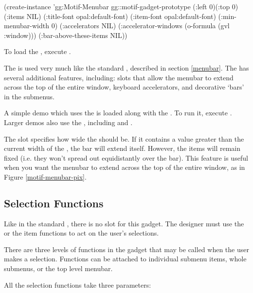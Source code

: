\begin{programexample}
(create-instance 'gg:Motif-Menubar gg::motif-gadget-prototype
  (:left 0)(:top 0)
  (:items NIL)
  (:title-font opal:default-font)
  (:item-font opal:default-font)
  (:min-menubar-width 0)
  (:accelerators NIL)
  (:accelerator-windows (o-formula (gvl :window)))
  (:bar-above-these-items NIL))
\end{programexample}

To load the , execute
.

The  is used very much like the standard ,
described in section \ref{menubar}.
The  has several additional features, including:
slots that allow the menubar to extend across the top of the entire window,
keyboard accelerators, and decorative `bars' in the submenus.

A simple demo which uses the  is loaded along with the
.  To run it, execute .
Larger demos also use the , including  and
.

The  slot specifies how wide the 
should be.  If it contains a value greater than the current
width of the , the bar will extend itself.  However, the
items will remain fixed (i.e. they won't spread out equidistantly over
the bar).  This feature is useful when you want the menubar to extend across
the top of the entire window, as in Figure \ref{motif-menubar-pix}.


\subsection{Selection Functions}
\label{mmbar-sel-fns}

Like in the standard , there is no  slot for this
gadget.  The designer must use the  or the
item functions to act on the user's selections.

There are three levels of functions in the  gadget that
may be called when the user makes a selection.  Functions can be
attached to individual submenu items, whole submenus, or the top level
menubar.

All the selection functions take three parameters:


